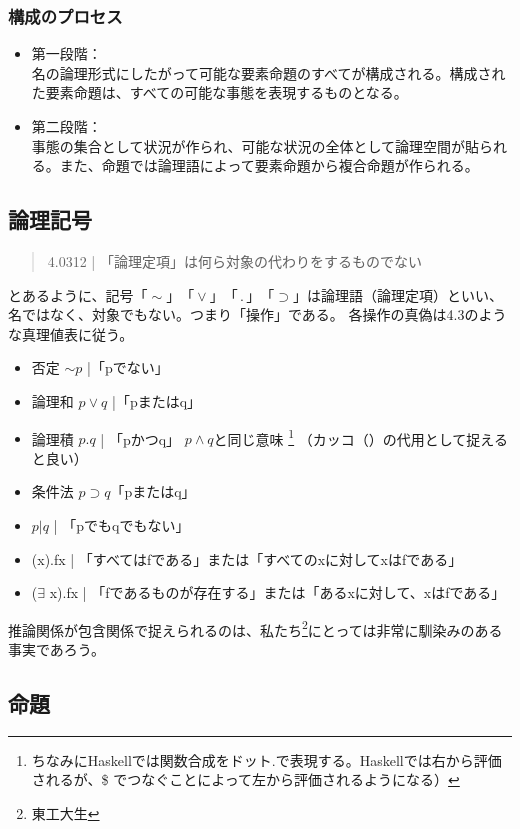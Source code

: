 \documentclass[a4paper,onecolumn,openany,article]{jsarticle}
\begin{document}
\subsubsection{構成のプロセス}

\begin{itemize}
\item 第一段階：\\ 名の論理形式にしたがって可能な要素命題のすべてが構成される。構成された要素命題は、すべての可能な事態を表現するものとなる。
\item 第二段階：\\ 事態の集合として状況が作られ、可能な状況の全体として論理空間が貼られる。また、命題では論理語によって要素命題から複合命題が作られる。

\end{itemize}


\subsection{論理記号}
\begin{quote}
  4.0312 | 「論理定項」は何ら対象の代わりをするものでない
\end{quote}
 とあるように、記号$「\sim」「\vee」 「\, . \,」 「\supset」$は論理語（論理定項）といい、名ではなく、対象でもない。つまり「操作」である。
各操作の真偽は4.3のような真理値表に従う。

\begin{itemize}
  \item 否定 $\sim p$ |「pでない」
  \item 論理和 $p\vee q$ |「pまたはq」
  \item 論理積 $p.q$ | 「pかつq」 $p \wedge q$と同じ意味
\footnote{ちなみにHaskellでは関数合成をドット$.$で表現する。Haskellでは右から評価されるが、\$ でつなぐことによって左から評価されるようになる）} （カッコ（）の代用として捉えると良い）  
  \item 条件法 $p \supset q$「pまたはq」
  \item $p | q$ | 「pでもqでもない」
  \item (x).fx |  「すべてはfである」または「すべてのxに対してxはfである」
  \item ($\exists$ x).fx | 「fであるものが存在する」または「あるxに対して、xはfである」
\end{itemize}

推論関係が包含関係で捉えられるのは、私たち\footnote{東工大生}にとっては非常に馴染みのある事実であろう。


\subsection{命題}
\end{document}
